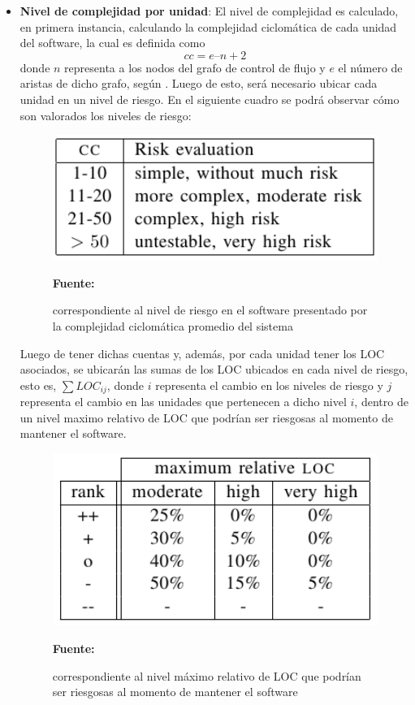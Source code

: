 \begin{itemize}
 
 \item \textbf{Nivel de complejidad por unidad}: El nivel de complejidad es calculado, en primera instancia, calculando la complejidad ciclomática de cada unidad del software, la cual es definida como $$cc = e – n + 2$$ donde $n$ representa a los nodos del grafo de control de flujo y $e$ el número de aristas de dicho grafo, según \cite{cyclomatic_complexity}. Luego de esto, será necesario ubicar cada unidad en un nivel de riesgo. En el siguiente cuadro se podrá observar cómo son valorados los niveles de riesgo:

\begin{figure}[!htb]
  \begin{center}
    \includegraphics[width=11cm]{./imagenes/mantainability2.png}
    \caption{correspondiente al nivel de riesgo en el software presentado por la complejidad ciclomática promedio del sistema}
    \label{fig:mantainability2}
    \textbf{Fuente:}  \cite{measuring_maintainability}
  \end{center}
\end{figure}

Luego de tener dichas cuentas y, además, por cada unidad tener los LOC asociados, se ubicarán las sumas de los LOC ubicados en cada nivel de riesgo, esto es, $\sum LOC_{ij}$, donde $i$ representa el cambio en los niveles de riesgo y $j$ representa el cambio en las unidades que pertenecen a dicho nivel $i$, dentro de un nivel maximo relativo de LOC que podrían ser riesgosas al momento de mantener el software.

\begin{figure}[!htb]
  \begin{center}
    \includegraphics[width=11cm]{./imagenes/mantainability3.png}
    \caption{correspondiente al nivel máximo relativo de LOC que podrían ser riesgosas al momento de mantener el software}
    \label{fig:mantainability3}
    \textbf{Fuente:}  \cite{measuring_maintainability}
  \end{center}
\end{figure}


\end{itemize}
